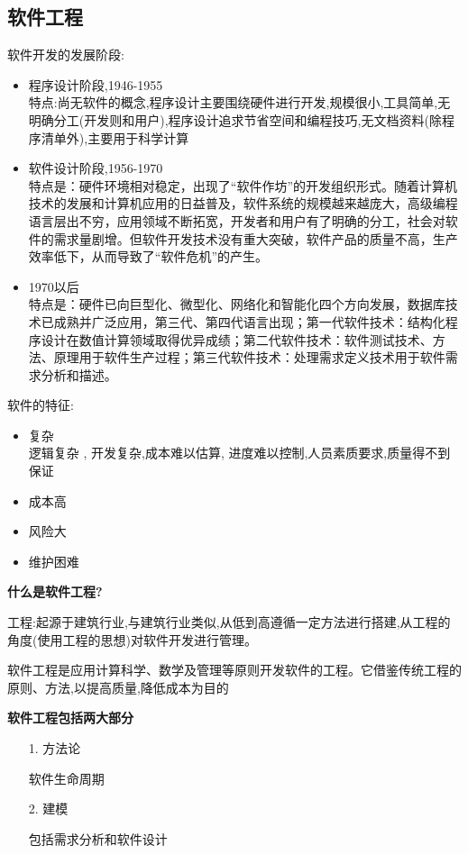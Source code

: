 \documentclass[UTF8,a4paper]{ctexart}
\begin{document}
\subsection{软件工程}
软件开发的发展阶段:
\begin{itemize}
  \item 程序设计阶段,1946-1955\\
  特点:尚无软件的概念,程序设计主要围绕硬件进行开发,规模很小,工具简单,无明确分工(开发则和用户),程序设计追求节省空间和编程技巧,无文档资料(除程序清单外),主要用于科学计算
  \item 软件设计阶段,1956-1970\\
  特点是：硬件环境相对稳定，出现了“软件作坊”的开发组织形式。随着计算机技术的发展和计算机应用的日益普及，软件系统的规模越来越庞大，高级编程语言层出不穷，应用领域不断拓宽，开发者和用户有了明确的分工，社会对软件的需求量剧增。但软件开发技术没有重大突破，软件产品的质量不高，生产效率低下，从而导致了“软件危机”的产生。
  \item 1970以后\\
  特点是：硬件已向巨型化、微型化、网络化和智能化四个方向发展，数据库技术已成熟并广泛应用，第三代、第四代语言出现；第一代软件技术：结构化程序设计在数值计算领域取得优异成绩；第二代软件技术：软件测试技术、方法、原理用于软件生产过程；第三代软件技术：处理需求定义技术用于软件需求分析和描述。
\end{itemize}

软件的特征:
\begin{itemize}
  \item 复杂\\
  逻辑复杂 , 开发复杂,成本难以估算, 进度难以控制,人员素质要求,质量得不到保证
  \item 成本高\\
  \item 风险大
  \item 维护困难
\end{itemize}

  \textbf{什么是软件工程?}

  工程:起源于建筑行业,与建筑行业类似,从低到高遵循一定方法进行搭建,从工程的角度(使用工程的思想)对软件开发进行管理。

  软件工程是应用计算科学、数学及管理等原则开发软件的工程。它借鉴传统工程的原则、方法,以提高质量,降低成本为目的

  \textbf{软件工程包括两大部分}
  \begin{itemize}
    \item [1.] 方法论

      软件生命周期
    \item [2.] 建模

      包括需求分析和软件设计
  \end{itemize}
\end{document}
